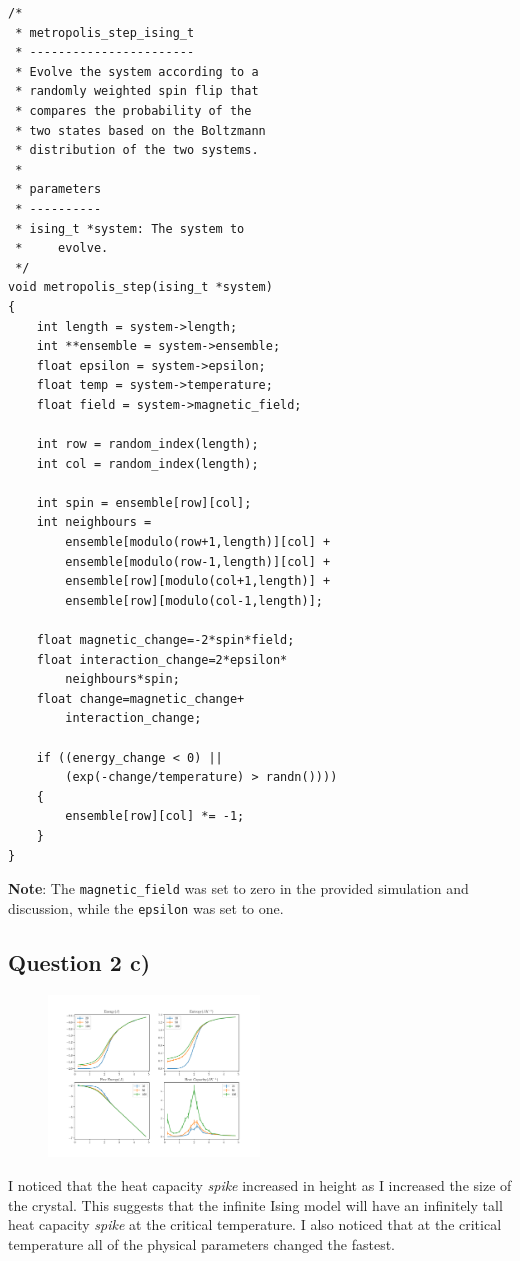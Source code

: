 \documentclass[a4paper, twocolumn]{article}
\begin{document}
\begin{lstlisting}
/*
 * metropolis_step_ising_t
 * -----------------------
 * Evolve the system according to a 
 * randomly weighted spin flip that 
 * compares the probability of the 
 * two states based on the Boltzmann 
 * distribution of the two systems. 
 *
 * parameters
 * ----------
 * ising_t *system: The system to 
 *     evolve. 
 */
void metropolis_step(ising_t *system)
{
    int length = system->length;
    int **ensemble = system->ensemble;
    float epsilon = system->epsilon;
    float temp = system->temperature;
    float field = system->magnetic_field;

    int row = random_index(length);
    int col = random_index(length);

    int spin = ensemble[row][col];
    int neighbours = 
        ensemble[modulo(row+1,length)][col] + 
        ensemble[modulo(row-1,length)][col] + 
        ensemble[row][modulo(col+1,length)] + 
        ensemble[row][modulo(col-1,length)];

    float magnetic_change=-2*spin*field;
    float interaction_change=2*epsilon*
        neighbours*spin;
    float change=magnetic_change+
        interaction_change;

    if ((energy_change < 0) || 
        (exp(-change/temperature) > randn())))
    {
        ensemble[row][col] *= -1;
    }
}
\end{lstlisting}


\textbf{Note}: The \verb!magnetic_field! was set to zero in the %
provided simulation and discussion, while the \verb!epsilon! %
was set to one. 


\subsection*{Question 2 c)}
\begin{figure}
    \centering
    \includegraphics[width=0.5\textwidth]{pub/figures/physical_parameters_ising_2d.pdf}
    \caption{}
    \label{fig:7}
\end{figure}
I noticed that the heat capacity \emph{spike} increased in %
height as I increased the size of the crystal. This suggests %
that the infinite Ising model will have an infinitely tall %
heat capacity \emph{spike} at the critical temperature. I also %
noticed that at the critical temperature all of the physical %
parameters changed the fastest. 
\end{document}
